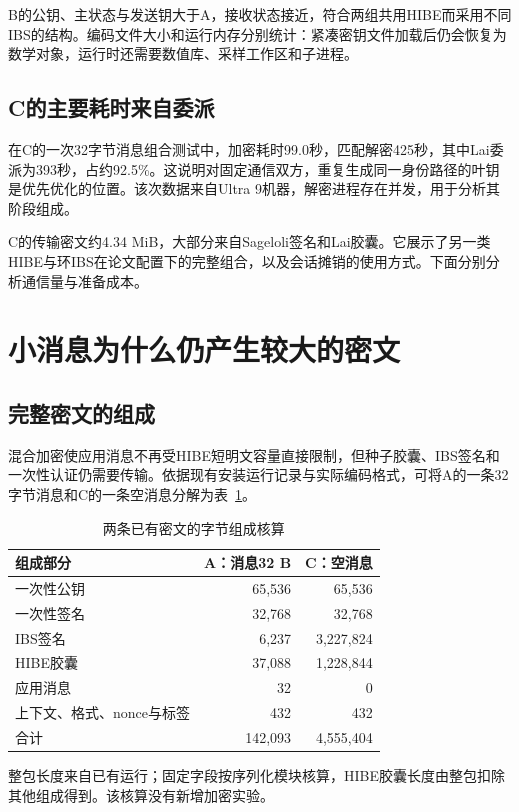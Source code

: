 B的公钥、主状态与发送钥大于A，接收状态接近，符合两组共用HIBE而采用不同IBS的结构。编码文件大小和运行内存分别统计：紧凑密钥文件加载后仍会恢复为数学对象，运行时还需要数值库、采样工作区和子进程。

\subsection{C的主要耗时来自委派}
在C的一次32字节消息组合测试中，加密耗时99.0秒，匹配解密425秒，其中Lai委派为393秒，占约92.5\%。这说明对固定通信双方，重复生成同一身份路径的叶钥是优先优化的位置。该次数据来自Ultra 9机器，解密进程存在并发，用于分析其阶段组成。

C的传输密文约4.34 MiB，大部分来自Sageloli签名和Lai胶囊。它展示了另一类HIBE与环IBS在论文配置下的完整组合，以及会话摊销的使用方式。下面分别分析通信量与准备成本。

\section{小消息为什么仍产生较大的密文}
\subsection{完整密文的组成}
混合加密使应用消息不再受HIBE短明文容量直接限制，但种子胶囊、IBS签名和一次性认证仍需要传输。依据现有安装运行记录与实际编码格式，可将A的一条32字节消息和C的一条空消息分解为表~\ref{tab:ciphertext-parts}。

\begin{table}[H]
\centering\small
\caption{两条已有密文的字节组成核算}
\label{tab:ciphertext-parts}
\begin{tabular}{@{}lrr@{}}
\toprule
\rowcolor{black!8} 组成部分 & A：消息32 B & C：空消息 \\
\midrule
一次性公钥 & 65,536 & 65,536 \\
一次性签名 & 32,768 & 32,768 \\
IBS签名 & 6,237 & 3,227,824 \\
HIBE胶囊 & 37,088 & 1,228,844 \\
应用消息 & 32 & 0 \\
上下文、格式、nonce与标签 & 432 & 432 \\
\midrule
合计 & 142,093 & 4,555,404 \\
\bottomrule
\end{tabular}
\begin{minipage}{.96\textwidth}\footnotesize
整包长度来自已有运行；固定字段按序列化模块核算，HIBE胶囊长度由整包扣除其他组成得到。该核算没有新增加密实验。
\end{minipage}
\end{table}

